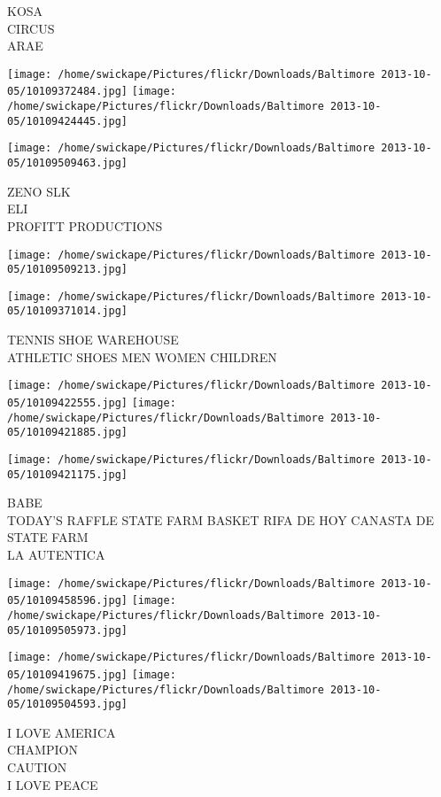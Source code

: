 \documentclass[10pt,letterpaper]{article}
\begin{document}
KOSA\\
CIRCUS\\
ARAE
\pagebreak

\texttt{[image: /home/swickape/Pictures/flickr/Downloads/Baltimore 2013-10-05/10109372484.jpg]}
\texttt{[image: /home/swickape/Pictures/flickr/Downloads/Baltimore 2013-10-05/10109424445.jpg]}

\vspace{0.25in}
\texttt{[image: /home/swickape/Pictures/flickr/Downloads/Baltimore 2013-10-05/10109509463.jpg]}

ZENO SLK\\
ELI\\
PROFITT PRODUCTIONS
\pagebreak

\texttt{[image: /home/swickape/Pictures/flickr/Downloads/Baltimore 2013-10-05/10109509213.jpg]}

\vspace{0.25in}
\texttt{[image: /home/swickape/Pictures/flickr/Downloads/Baltimore 2013-10-05/10109371014.jpg]}

TENNIS SHOE WAREHOUSE\\
ATHLETIC SHOES MEN WOMEN CHILDREN
\pagebreak

\texttt{[image: /home/swickape/Pictures/flickr/Downloads/Baltimore 2013-10-05/10109422555.jpg]}
\texttt{[image: /home/swickape/Pictures/flickr/Downloads/Baltimore 2013-10-05/10109421885.jpg]}

\vspace{0.25in}
\texttt{[image: /home/swickape/Pictures/flickr/Downloads/Baltimore 2013-10-05/10109421175.jpg]}

BABE\\
TODAY'S RAFFLE STATE FARM BASKET RIFA DE HOY CANASTA DE STATE FARM\\
LA AUTENTICA
\pagebreak

\texttt{[image: /home/swickape/Pictures/flickr/Downloads/Baltimore 2013-10-05/10109458596.jpg]}
\texttt{[image: /home/swickape/Pictures/flickr/Downloads/Baltimore 2013-10-05/10109505973.jpg]}

\texttt{[image: /home/swickape/Pictures/flickr/Downloads/Baltimore 2013-10-05/10109419675.jpg]}
\texttt{[image: /home/swickape/Pictures/flickr/Downloads/Baltimore 2013-10-05/10109504593.jpg]}

I LOVE AMERICA\\
CHAMPION\\
CAUTION\\
I LOVE PEACE
\pagebreak
\end{document}
